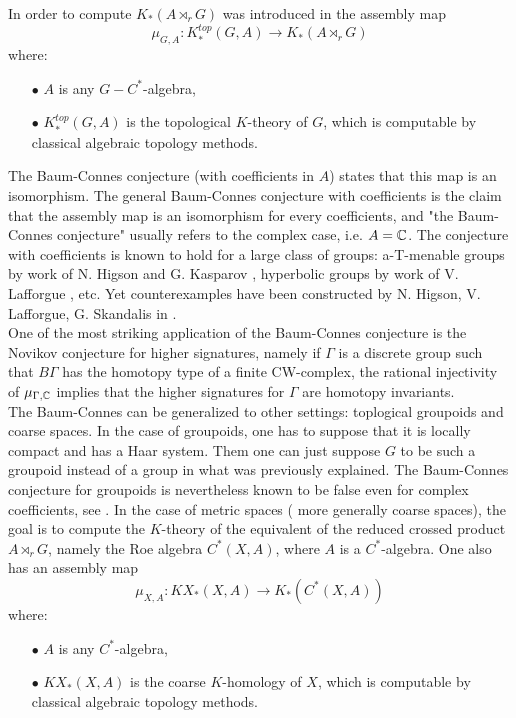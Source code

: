In order to compute $K_*(A\rtimes_r G)$ was introduced in \cite{BaumconnesHigson} the assembly map
\[\mu_{G,A}: K_*^{top}(G,A)\rightarrow K_*(A\rtimes_r G)\]
where:
\begin{itemize}
\item[$\bullet$] $A$ is any $G-C^*$-algebra, 
\item[$\bullet$] $K_*^{top}(G,A)$ is the topological $K$-theory of $G$, which is computable by classical algebraic topology methods.
\end{itemize}

The Baum-Connes conjecture (with coefficients in $A$) states that this map is an isomorphism. The general Baum-Connes conjecture with coefficients is the claim that the assembly map is an isomorphism for every coefficients, and "the Baum-Connes conjecture" usually refers to the complex case, i.e. $A=\mathbb C$. The conjecture with coefficients is known to hold for a large class of groups: a-T-menable groups by work of N. Higson and G. Kasparov \cite{higsonkasparov}, hyperbolic groups by work of V. Lafforgue \cite{lafforgue2012conjecture}, etc. Yet counterexamples have been constructed by N. Higson, V. Lafforgue, G. Skandalis in \cite{HigsonLaffSk}.\\

One of the most striking application of the Baum-Connes conjecture is the Novikov conjecture for higher signatures, namely if $\Gamma$ is a discrete group such that $B\Gamma$ has the homotopy type of a finite CW-complex, the rational injectivity of $\mu_{\Gamma,\mathbb C}$ implies that the higher signatures for $\Gamma$ are homotopy invariants.\\

The Baum-Connes can be generalized to other settings: toplogical groupoids and coarse spaces. In the case of groupoids, one has to suppose that it is locally compact and has a Haar system. Them one can just suppose $G$ to be such a groupoid instead of a group in what was previously explained. The Baum-Connes conjecture for groupoids is nevertheless known to be false even for complex coefficients, see \cite{HigsonLaffSk}. In the case of metric spaces ( more generally coarse spaces), the goal is to compute the $K$-theory of the equivalent of the reduced crossed product $A\rtimes_r G$, namely the Roe algebra $C^*(X,A)$, where $A$ is a $C^*$-algebra. One also has an assembly map
\[\mu_{X,A}: KX_*(X,A)\rightarrow K_*(C^*(X,A))\]
where:
\begin{itemize}
\item[$\bullet$] $A$ is any $C^*$-algebra, 
\item[$\bullet$] $KX_*(X,A)$ is the coarse $K$-homology of $X$, which is computable by classical algebraic topology methods.
\end{itemize}

